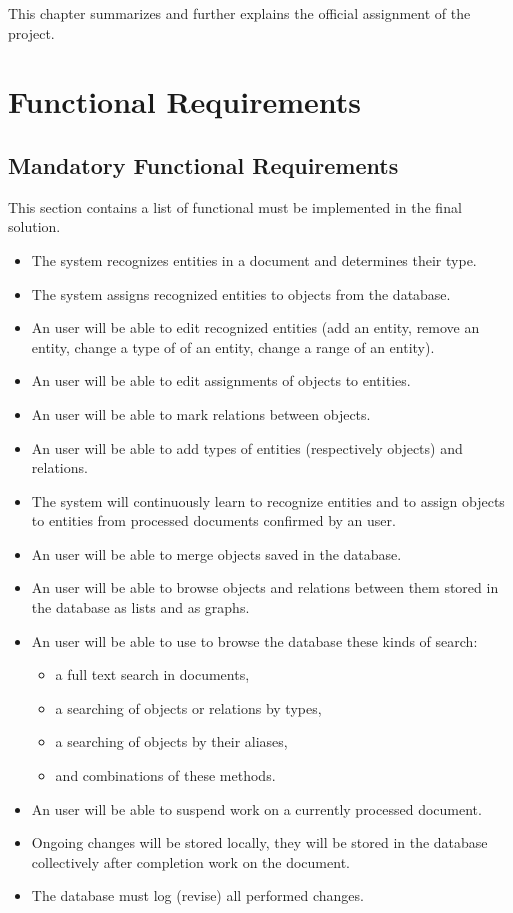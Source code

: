 
This chapter summarizes and further explains the official assignment of the
project.

\section{Functional Requirements}
\subsection{Mandatory Functional Requirements}
This section contains a list of functional must be implemented in the final solution.

\begin{itemize}
	\item The system recognizes entities in a document and determines their type.
	\item The system assigns recognized entities to objects from the database.
	\item An user will be able to edit recognized entities (add an entity, remove
	an entity, change a type of of an entity, change a range of an entity).
	\item An user will be able to edit assignments of objects to entities.
	\item An user will be able to mark relations between objects.
	\item An user will be able to add types of entities (respectively objects)
	and relations.
	\item The system will continuously learn to recognize entities and to assign
	objects to entities from processed documents confirmed by an user.
	\item An user will be able to merge objects saved in the database.
	\item An user will be able to browse objects and relations between them stored
	in the database as lists and as graphs.
	\item An user will be able to use to browse the database these kinds of search:
	\begin{itemize}
		\item a full text search in documents,
		\item a searching of objects or relations by types,
		\item a searching of objects by their aliases,
		\item and combinations of these methods.
	\end{itemize}
	\item An user will be able to suspend work on a currently processed document.
	\item Ongoing changes will be stored locally, they will be stored in the database
	collectively after completion work on the document.
	\item The database must log (revise) all performed changes.
\end{itemize}

